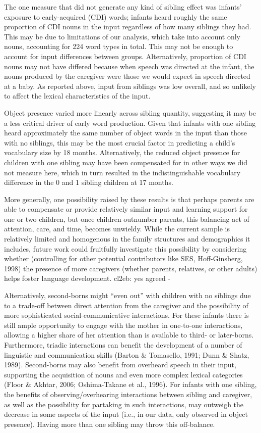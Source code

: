 \documentclass[
  english,
  man,floatsintext]{apa6}
\begin{document}
The one measure that did not generate any kind of sibling effect was infants' exposure to early-acquired (CDI) words; infants heard roughly the same proportion of CDI nouns in the input regardless of how many siblings they had. This may be due to limitations of our analysis, which take into account only nouns, accounting for 224 word types in total. This may not be enough to account for input differences between groups. Alternatively, proportion of CDI nouns may not have differed because when speech was directed at the infant, the nouns produced by the caregiver were those we would expect in speech directed at a baby. As reported above, input from siblings was low overall, and so unlikely to affect the lexical characteristics of the input.

Object presence varied more linearly across sibling quantity, suggesting it may be a less critical driver of early word production. Given that infants with one sibling heard approximately the same number of object words in the input than those with no siblings, this may be the most crucial factor in predicting a child's vocabulary size by 18 months. Alternatively, the reduced object presence for children with one sibling may have been compensated for in other ways we did not measure here, which in turn resulted in the indistinguishable vocabulary difference in the 0 and 1 sibling children at 17 months.

More generally, one possibility raised by these results is that perhaps parents are able to compensate or provide relatively similar input and learning support for one or two children, but once children outnumber parents, this balancing act of attention, care, and time, becomes unwieldy. While the current sample is relatively limited and homogenous in the family structures and demographics it includes, future work could fruitfully investigate this possibility by considering whether (controlling for other potential contributors like SES, Hoff-Ginsberg, 1998) the presence of more caregivers (whether parents, relatives, or other adults) helps foster language development.
cl2eb: yes agreed -

Alternatively, second-borns might \enquote{even out} with children with no siblings due to a trade-off between direct attention from the caregiver and the possibility of more sophisticated social-communicative interactions. For these infants there is still ample opportunity to engage with the mother in one-to-one interactions, allowing a higher share of her attention than is available to third- or later-borns. Furthermore, triadic interactions can benefit the development of a number of linguistic and communication skills (Barton \& Tomasello, 1991; Dunn \& Shatz, 1989). Second-borns may also benefit from overheard speech in their input, supporting the acquisition of nouns and even more complex lexical categories (Floor \& Akhtar, 2006; Oshima-Takane et al., 1996). For infants with one sibling, the benefits of observing/overhearing interactions between sibling and caregiver, as well as the possibility for partaking in such interactions, may outweigh the decrease in some aspects of the input (i.e., in our data, only observed in object presence). Having more than one sibling may throw this off-balance.
\end{document}
